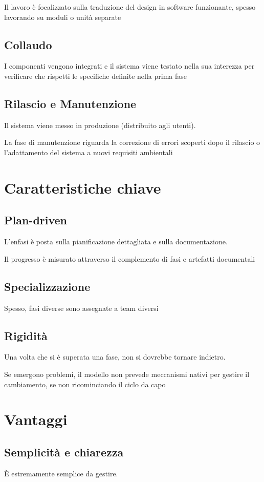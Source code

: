 Il lavoro è focalizzato sulla traduzione del design in software funzionante, spesso lavorando su moduli o unità separate

\subsection{Collaudo}
I componenti vengono integrati e il sistema viene testato nella sua interezza per verificare che rispetti le specifiche definite nella prima fase

\subsection{Rilascio e Manutenzione}
Il sistema viene messo in produzione (distribuito agli utenti).

La fase di manutenzione riguarda la correzione di errori scoperti dopo il rilascio o l'adattamento del sistema a nuovi requisiti ambientali

\section{Caratteristiche chiave}
\subsection{Plan-driven}
L'enfasi è posta sulla pianificazione dettagliata e sulla documentazione.

Il progresso è misurato attraverso il complemento di fasi e artefatti documentali

\subsection{Specializzazione}
Spesso, fasi diverse sono assegnate a team diversi

\subsection{Rigidità}
Una volta che si è superata una fase, non si dovrebbe tornare indietro.

Se emergono problemi, il modello non prevede meccanismi nativi per gestire il cambiamento, se non ricominciando il ciclo da capo


\section{Vantaggi}
\subsection{Semplicità e chiarezza}
È estremamente semplice da gestire.


